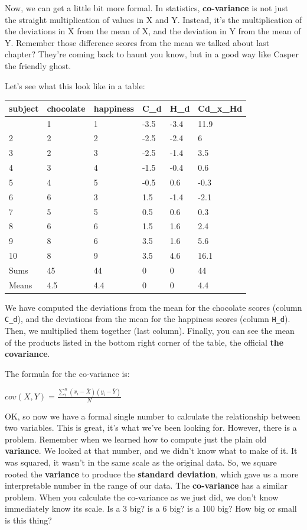\documentclass[
  letterpaper,
  DIV=11,
  numbers=noendperiod]{scrreprt}
\begin{document}
Now, we can get a little bit more formal. In statistics,
\textbf{co-variance} is not just the straight multiplication of values
in X and Y. Instead, it's the multiplication of the deviations in X from
the mean of X, and the deviation in Y from the mean of Y. Remember those
difference scores from the mean we talked about last chapter? They're
coming back to haunt you know, but in a good way like Casper the
friendly ghost.

Let's see what this look like in a table:

\begin{longtable}[]{@{}llllll@{}}
\toprule\noalign{}
subject & chocolate & happiness & C\_d & H\_d & Cd\_x\_Hd \\
\midrule\noalign{}
\endhead
\bottomrule\noalign{}
\endlastfoot
1 & 1 & 1 & -3.5 & -3.4 & 11.9 \\
2 & 2 & 2 & -2.5 & -2.4 & 6 \\
3 & 2 & 3 & -2.5 & -1.4 & 3.5 \\
4 & 3 & 4 & -1.5 & -0.4 & 0.6 \\
5 & 4 & 5 & -0.5 & 0.6 & -0.3 \\
6 & 6 & 3 & 1.5 & -1.4 & -2.1 \\
7 & 5 & 5 & 0.5 & 0.6 & 0.3 \\
8 & 6 & 6 & 1.5 & 1.6 & 2.4 \\
9 & 8 & 6 & 3.5 & 1.6 & 5.6 \\
10 & 8 & 9 & 3.5 & 4.6 & 16.1 \\
Sums & 45 & 44 & 0 & 0 & 44 \\
Means & 4.5 & 4.4 & 0 & 0 & 4.4 \\
\end{longtable}

We have computed the deviations from the mean for the chocolate scores
(column \texttt{C\_d}), and the deviations from the mean for the
happiness scores (column \texttt{H\_d}). Then, we multiplied them
together (last column). Finally, you can see the mean of the products
listed in the bottom right corner of the table, the official \textbf{the
covariance}.

The formula for the co-variance is:

\(cov(X,Y) = \frac{\sum_{i}^{n}(x_{i}-\bar{X})(y_{i}-\bar{Y})}{N}\)

OK, so now we have a formal single number to calculate the relationship
between two variables. This is great, it's what we've been looking for.
However, there is a problem. Remember when we learned how to compute
just the plain old \textbf{variance}. We looked at that number, and we
didn't know what to make of it. It was squared, it wasn't in the same
scale as the original data. So, we square rooted the \textbf{variance}
to produce the \textbf{standard deviation}, which gave us a more
interpretable number in the range of our data. The \textbf{co-variance}
has a similar problem. When you calculate the co-variance as we just
did, we don't know immediately know its scale. Is a 3 big? is a 6 big?
is a 100 big? How big or small is this thing?
\end{document}
